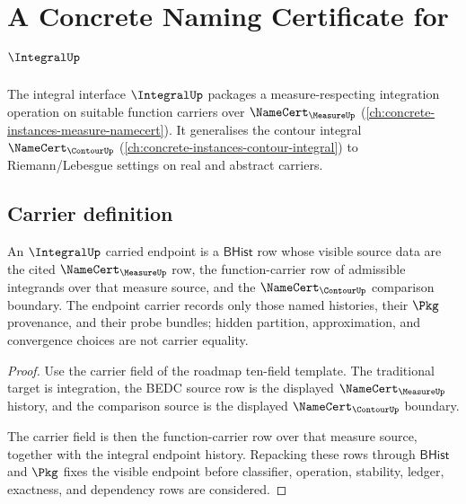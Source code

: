 \chapter{A Concrete Naming Certificate for $\IntegralUp$}
\label{ch:concrete-instances-integral-namecert}

The integral interface $\IntegralUp$ packages a measure-respecting integration operation on suitable function carriers over $\NameCert_{\MeasureUp}$ (\autoref{ch:concrete-instances-measure-namecert}). It generalises the contour integral $\NameCert_{\ContourUp}$ (\autoref{ch:concrete-instances-contour-integral}) to Riemann/Lebesgue settings on real and abstract carriers.

\section{Carrier definition}
\label{sec:integral-carrier}

\begin{theorem}\label{thm:integral-function-carrier-obligation}
An $\IntegralUp$ carried endpoint is a $\mathsf{BHist}$ row whose visible source data are the cited $\NameCert_{\MeasureUp}$ row, the function-carrier row of admissible integrands over that measure source, and the $\NameCert_{\ContourUp}$ comparison boundary. The endpoint carrier records only those named histories, their $\Pkg$ provenance, and their probe bundles; hidden partition, approximation, and convergence choices are not carrier equality.
\end{theorem}
\begin{proof}
Use the carrier field of the roadmap ten-field template. The traditional target is integration, the BEDC source row is the displayed $\NameCert_{\MeasureUp}$ history, and the comparison source is the displayed $\NameCert_{\ContourUp}$ boundary.

The carrier field is then the function-carrier row over that measure source, together with the integral endpoint history. Repacking these rows through $\mathsf{BHist}$ and $\Pkg$ fixes the visible endpoint before classifier, operation, stability, ledger, exactness, and dependency rows are considered.
\end{proof}

